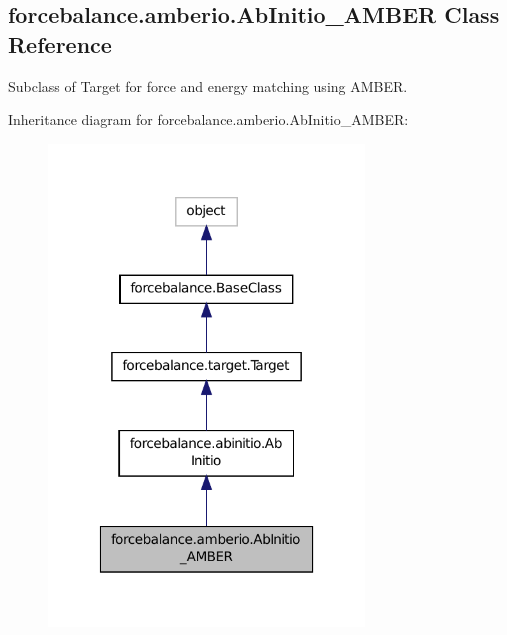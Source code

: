 \hypertarget{classforcebalance_1_1amberio_1_1AbInitio__AMBER}{\subsection{forcebalance.\-amberio.\-Ab\-Initio\-\_\-\-A\-M\-B\-E\-R Class Reference}
\label{classforcebalance_1_1amberio_1_1AbInitio__AMBER}
}


Subclass of Target for force and energy matching using A\-M\-B\-E\-R.  




Inheritance diagram for forcebalance.\-amberio.\-Ab\-Initio\-\_\-\-A\-M\-B\-E\-R\-:\nopagebreak
\begin{figure}[H]
\begin{center}
\leavevmode
\includegraphics[width=238pt]{classforcebalance_1_1amberio_1_1AbInitio__AMBER__inherit__graph}
\end{center}
\end{figure}


